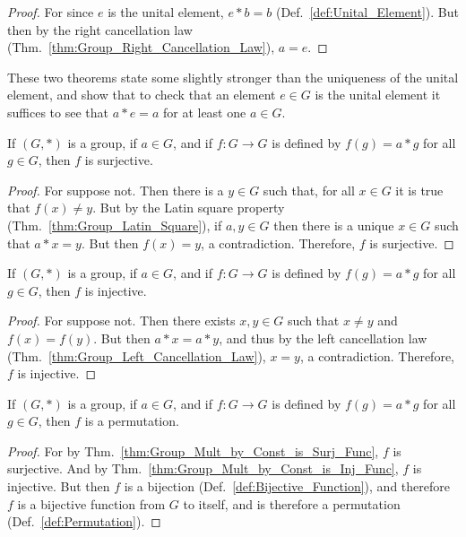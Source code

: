     \begin{proof}
        For since $e$ is the unital element, $e*b=b$
        (Def.~\ref{def:Unital_Element}). But then by the right cancellation
        law (Thm.~\ref{thm:Group_Right_Cancellation_Law}), $a=e$.
    \end{proof}
    These two theorems state some slightly stronger than the uniqueness of
    the unital element, and show that to check that an element $e\in{G}$ is the
    unital element it suffices to see that $a*e=a$ for at least one $a\in{G}$.
    \begin{theorem}
        \label{thm:Group_Mult_by_Const_is_Surj_Func}%
        If $(G,*)$ is a group, if $a\in{G}$, and if $f:G\rightarrow{G}$ is
        defined by $f(g)=a*g$ for all $g\in{G}$, then $f$ is surjective.
    \end{theorem}
    \begin{proof}
        For suppose not. Then there is a $y\in{G}$ such that, for all $x\in{G}$
        it is true that $f(x)\ne{y}$. But by the Latin square property
        (Thm.~\ref{thm:Group_Latin_Square}), if $a,y\in{G}$ then there is a
        unique $x\in{G}$ such that $a*x=y$. But then $f(x)=y$, a contradiction.
        Therefore, $f$ is surjective.
    \end{proof}
    \begin{theorem}
        \label{thm:Group_Mult_by_Const_is_Inj_Func}%
        If $(G,*)$ is a group, if $a\in{G}$, and if $f:G\rightarrow{G}$ is
        defined by $f(g)=a*g$ for all $g\in{G}$, then $f$ is injective.
    \end{theorem}
    \begin{proof}
        For suppose not. Then there exists $x,y\in{G}$ such that $x\ne{y}$ and
        $f(x)=f(y)$. But then $a*x=a*y$, and thus by the left cancellation law
        (Thm.~\ref{thm:Group_Left_Cancellation_Law}), $x=y$, a contradiction.
        Therefore, $f$ is injective.
    \end{proof}
    \begin{theorem}
        If $(G,*)$ is a group, if $a\in{G}$, and if $f:G\rightarrow{G}$ is
        defined by $f(g)=a*g$ for all $g\in{G}$, then $f$ is a permutation.
    \end{theorem}
    \begin{proof}
        For by Thm.~\ref{thm:Group_Mult_by_Const_is_Surj_Func}, $f$ is
        surjective. And by Thm.~\ref{thm:Group_Mult_by_Const_is_Inj_Func},
        $f$ is injective. But then $f$ is a bijection
        (Def.~\ref{def:Bijective_Function}), and therefore $f$ is a bijective
        function from $G$ to itself, and is therefore a permutation
        (Def.~\ref{def:Permutation}).
    \end{proof}
